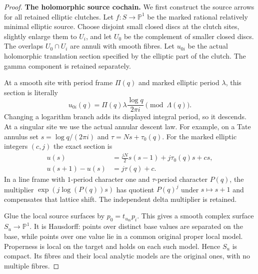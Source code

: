 \begin{proof}
\par\medskip\noindent\textbf{The holomorphic source cochain.}
We first construct the source arrows for all retained elliptic
clutches. Let $f:S\to\mathbb P^1$ be the marked rational
relatively minimal elliptic source. Choose disjoint small
closed discs at the clutch sites, slightly enlarge them to
$U_i$, and let $U_0$ be the complement of smaller closed discs.
The overlaps $U_0\cap U_i$ are annuli with smooth fibres.
Let $u_{0i}$ be the actual holomorphic translation section
specified by the elliptic part of the clutch. The gamma
component is retained separately.

At a smooth site with period frame $\Pi(q)$ and marked
elliptic period $\lambda$, this section is literally
\[
       u_{0i}(q)=\Pi(q)\lambda\frac{\log q}{2\pi i}
                         \pmod {\Lambda(q)}.
\]
Changing a logarithm branch adds its displayed integral
period, so it descends. At a singular site we use the actual
annular descent law. For example, on a Tate annulus set
$s=\log q/(2\pi i)$ and $\tau=Ns+\tau_0(q)$. For the
marked elliptic integers $(c,j)$ the exact section is
\[
 \begin{split}
 u(s)&=\frac{jN}{2}s(s-1)+j\tau_0(q)s+cs,\\
 u(s+1)-u(s)&=j\tau(q)+c.                             
 \end{split}\tag{K32.4}
\]
In a line frame with $1$-period character one and
$\tau$-period character $P(q)$, the multiplier
$\exp(j\log(P(q))s)$ has quotient $P(q)^j$ under
$s\mapsto s+1$ and compensates that lattice shift. The
independent delta multiplier is retained.

Glue the local source surfaces by
$p_0=t_{u_{0i}}p_i$. This gives a smooth complex surface
$S_u\to\mathbb P^1$. It is Hausdorff: points over distinct
base values are separated on the base, while points over
one value lie in a common original proper local model.
Properness is local on the target and holds on each such
model. Hence $S_u$ is compact. Its fibres and their local
analytic models are the original ones, with no multiple
fibres.


\end{proof}
